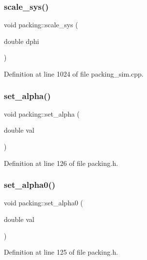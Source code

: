 \subsubsection{\texorpdfstring{scale\+\_\+sys()}{scale\_sys()}}
{\footnotesize\ttfamily void packing\+::scale\+\_\+sys (\begin{DoxyParamCaption}\item[{double}]{dphi }\end{DoxyParamCaption})}



Definition at line 1024 of file packing\+\_\+sim.\+cpp.

\mbox{\label{classpacking_aa80ff9c4b9ec36807a0d42ce28f50d2a}} 
\subsubsection{\texorpdfstring{set\+\_\+alpha()}{set\_alpha()}}
{\footnotesize\ttfamily void packing\+::set\+\_\+alpha (\begin{DoxyParamCaption}\item[{double}]{val }\end{DoxyParamCaption})\hspace{0.3cm}{\ttfamily [inline]}}



Definition at line 126 of file packing.\+h.

\mbox{\label{classpacking_a33a628e0d2d7bcaa72f6a205a3244e76}} 
\subsubsection{\texorpdfstring{set\+\_\+alpha0()}{set\_alpha0()}}
{\footnotesize\ttfamily void packing\+::set\+\_\+alpha0 (\begin{DoxyParamCaption}\item[{double}]{val }\end{DoxyParamCaption})\hspace{0.3cm}{\ttfamily [inline]}}



Definition at line 125 of file packing.\+h.

\mbox{\label{classpacking_a2d86b4b1188bd7d3c9b13dacbb0ca2fb}} 
